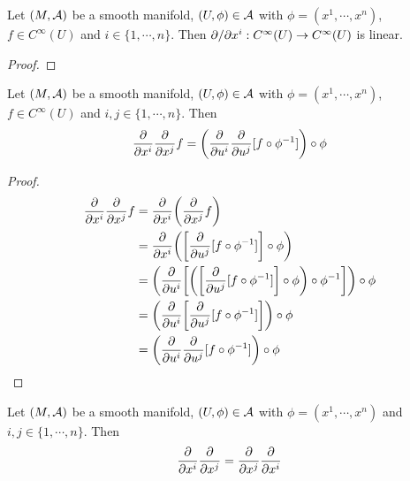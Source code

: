 \documentclass{book}
\begin{document}
\begin{ex}  
	Let $(M, \mathcal{A})$ be a smooth manifold, $(U, \phi) \in \mathcal{A}$ with $\phi = (x^1, \cdots, x^n)$, $f \in C^{\infty}(U)$ and $i \in \{1, \cdots, n\}$. Then $\partial / \partial x^i:  C^{\infty}(U) \rightarrow C^{\infty}(U)$ is linear.
\end{ex}

\begin{proof}
\end{proof}

\begin{ex}  
	Let $(M, \mathcal{A})$ be a smooth manifold, $(U, \phi) \in \mathcal{A}$ with $\phi = (x^1, \cdots, x^n)$, $f \in C^{\infty}(U)$ and $i,j \in \{1, \cdots, n\}$. Then 
	$$\frac{\partial}{\partial x^i}\frac{\partial}{\partial x^j} f =  \bigg(\frac{\partial}{\partial u^i} \frac{\partial}{\partial u^j}[f \circ \phi^{-1}] \bigg) \circ \phi $$
\end{ex}

\begin{proof}
	
	\begin{align*}
		\frac{\partial}{\partial x^i}\frac{\partial}{\partial x^j} f 
		&=\frac{\partial}{\partial x^i} \bigg(\frac{\partial}{\partial x^j} f \bigg) \\
		&=\frac{\partial}{\partial x^i} \bigg( \bigg[\frac{\partial}{\partial u^j} [f \circ \phi^{-1}] \bigg] \circ \phi \bigg) \\
		&=  \bigg( \frac{\partial}{\partial u^i} \bigg[ \bigg( \bigg[\frac{\partial}{\partial u^j} [f \circ \phi^{-1}] \bigg] \circ \phi \bigg) \circ \phi^{-1} \bigg] \bigg) \circ \phi \\
		&= \bigg( \frac{\partial}{\partial u^i} \bigg[\frac{\partial}{\partial u^j} [f \circ \phi^{-1}] \bigg]  \bigg) \circ \phi \\
		&= \bigg( \frac{\partial}{\partial u^i} \frac{\partial}{\partial u^j} [f \circ \phi^{-1}]  \bigg) \circ \phi \\
	\end{align*}
\end{proof}

\begin{ex}  
	Let $(M, \mathcal{A})$ be a smooth manifold, $(U, \phi) \in \mathcal{A}$ with $\phi = (x^1, \cdots, x^n)$ and $i,j \in \{1, \cdots, n\}$. Then 
	\begin{equation*}
		\frac{\partial}{\partial x^i}\frac{\partial}{\partial x^j} =\frac{\partial}{\partial x^j}\frac{\partial}{\partial x^i}
	\end{equation*}
\end{ex}
\end{document}
